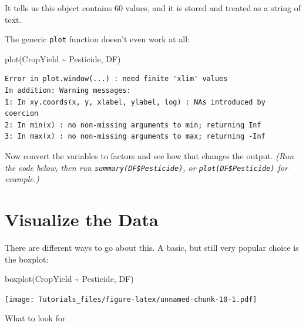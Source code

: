\documentclass[
]{book}
\newenvironment{Shaded}{\begin{snugshade}}{\end{snugshade}}
\newcommand{\FunctionTok}[1]{\textcolor[rgb]{0.00,0.00,0.00}{#1}}
\newcommand{\NormalTok}[1]{#1}
\newcommand{\OtherTok}[1]{\textcolor[rgb]{0.56,0.35,0.01}{#1}}
\newcommand{\SpecialCharTok}[1]{\textcolor[rgb]{0.00,0.00,0.00}{#1}}
\begin{document}
It tells us this object contains 60 values, and it is stored and treated as a string of text.

The generic \texttt{plot} function doesn't even work at all:

\begin{Shaded}
\begin{Highlighting}[]
\FunctionTok{plot}\NormalTok{(CropYield }\SpecialCharTok{\textasciitilde{}}\NormalTok{ Pesticide, DF)}
\end{Highlighting}
\end{Shaded}

\begin{verbatim}
Error in plot.window(...) : need finite 'xlim' values
In addition: Warning messages:
1: In xy.coords(x, y, xlabel, ylabel, log) : NAs introduced by coercion
2: In min(x) : no non-missing arguments to min; returning Inf
3: In max(x) : no non-missing arguments to max; returning -Inf
\end{verbatim}

Now convert the variables to factors and see how that changes the output. \emph{(Run the code below, then run \texttt{summary(DF\$Pesticide)}, or \texttt{plot(DF\$Pesticide)} for example.)}

\begin{Shaded}
\end{Shaded}

\hypertarget{vis-t}{%
\section{Visualize the Data}\label{vis-t}}

There are different ways to go about this. A basic, but still very popular choice is the boxplot:

\begin{Shaded}
\begin{Highlighting}[]
\FunctionTok{boxplot}\NormalTok{(CropYield }\SpecialCharTok{\textasciitilde{}}\NormalTok{ Pesticide, DF)}
\end{Highlighting}
\end{Shaded}

\texttt{[image: Tutorials\_files/figure-latex/unnamed-chunk-10-1.pdf]}

What to look for
\end{document}
